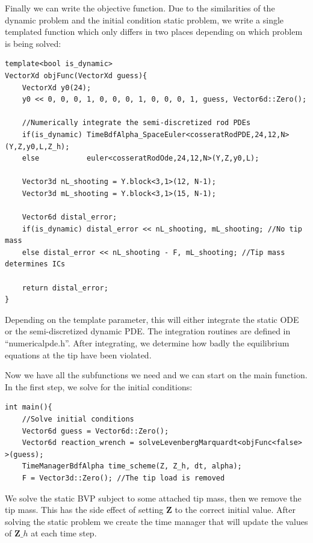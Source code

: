 \documentclass[12pt]{article}
\begin{document}
Finally we can write the objective function. Due to the similarities of the dynamic problem and the initial condition static problem, we write a single templated function which only differs in two places depending on which problem is being solved:

\begin{lstlisting}
template<bool is_dynamic>
VectorXd objFunc(VectorXd guess){
    VectorXd y0(24);
    y0 << 0, 0, 0, 1, 0, 0, 0, 1, 0, 0, 0, 1, guess, Vector6d::Zero();

    //Numerically integrate the semi-discretized rod PDEs
    if(is_dynamic) TimeBdfAlpha_SpaceEuler<cosseratRodPDE,24,12,N>(Y,Z,y0,L,Z_h);
    else           euler<cosseratRodOde,24,12,N>(Y,Z,y0,L);

    Vector3d nL_shooting = Y.block<3,1>(12, N-1);
    Vector3d mL_shooting = Y.block<3,1>(15, N-1);

    Vector6d distal_error;
    if(is_dynamic) distal_error << nL_shooting, mL_shooting; //No tip mass
    else distal_error << nL_shooting - F, mL_shooting; //Tip mass determines ICs

    return distal_error;
}
\end{lstlisting}
Depending on the template parameter, this will either integrate the static ODE or the semi-discretized dynamic PDE. The integration routines are defined in ``numericalpde.h''. After integrating, we determine how badly the equilibrium equations at the tip have been violated.

Now we have all the subfunctions we need and we can start on the main function. In the first step, we solve for the initial conditions:
\begin{lstlisting}
int main(){
    //Solve initial conditions
    Vector6d guess = Vector6d::Zero();
    Vector6d reaction_wrench = solveLevenbergMarquardt<objFunc<false> >(guess);
    TimeManagerBdfAlpha time_scheme(Z, Z_h, dt, alpha);
    F = Vector3d::Zero(); //The tip load is removed
\end{lstlisting}
We solve the static BVP subject to some attached tip mass, then we remove the tip mass. This has the side effect of setting $\boldsymbol{Z}$ to the correct initial value. After solving the static problem we create the time manager that will update the values of $\boldsymbol{Z}\_h$ at each time step.
\end{document}

